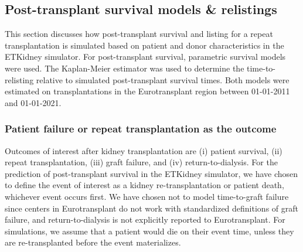 

\newcommand\Time{{\hspace{-.25pt}\intercal}}


\subsection{Post-transplant survival models \& relistings}
This section discusses how post-transplant survival and listing for a repeat transplantation is simulated based on patient and donor characteristics in the ETKidney simulator. For post-transplant survival, parametric survival models were used. The Kaplan-Meier estimator was used to determine the time-to-relisting relative to simulated post-transplant survival times. Both models were estimated on transplantations in the Eurotransplant region between 01-01-2011 and 01-01-2021. 

\subsubsection{Patient failure or repeat transplantation as the outcome}
Outcomes of interest after kidney transplantation are (i) patient survival, (ii) repeat transplantation, (iii) graft failure, and (iv) return-to-dialysis. For the prediction of post-transplant survival in the ETKidney simulator, we have chosen to define the event of interest as a kidney re-transplantation or patient death, whichever event occurs first. We have chosen not to model time-to-graft failure since centers in Eurotransplant do not work with standardized definitions of graft failure, and return-to-dialysis is not explicitly reported to Eurotransplant. For simulations, we assume that a patient would die on their event time, unless they are re-transplanted before the event materializes.

